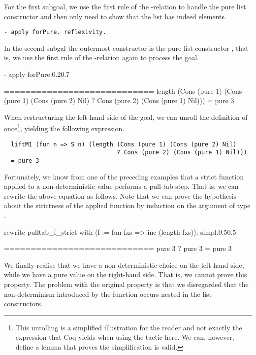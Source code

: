 For the first subgoal, we use the first rule of the -relation to handle the pure list constructor and then only need to show that the list has indeed  elements.

\begin{verbatim}
- apply forPure. reflexivity.
\end{verbatim}

In the second subgal the outermost constructor is the pure list constructor , that is, we use the first rule of the -relation again to process the goal.

\begin{cproof1}{- apply forPure.}{0.2}{0.7}

  ============================
  length (Cons (pure 1) (Cons (pure 1) (Cons (pure 2) Nil)
         ? Cons (pure 2) (Cons (pure 1) Nil)))
  = pure 3
\end{cproof1}

When restructuring the left-hand side of the goal, we can unroll the definition of  once\footnote{This unrolling is a simplified illustration for the reader and not exactly the expression that Coq yields when using the tactic  here. We can, however, define a lemma that proves the simplification is valid.}, yielding the following expression.

\begin{verbatim}
  liftM1 (fun n => S n) (length (Cons (pure 1) (Cons (pure 2) Nil)
                                ? Cons (pure 2) (Cons (pure 1) Nil)))
  = pure 3
\end{verbatim}

Fortunately, we know from one of the preceding examples that a strict function applied to a non-deterministic value performs a pull-tab step.
That is, we can rewrite the above equation as follows.
Note that we can prove the hypothesis about the strictness of the applied function  by induction on the argument of type .

\begin{cproof1}{rewrite pulltab_f_strict with (f := fun fxs => inc (length fxs)); simpl.}{0.5}{0.5}

  ============================
  pure 3 ? pure 3 = pure 3
\end{cproof1}

We finally realise that we have a non-deterministic choice on the left-hand side, while we have a pure value on the right-hand side.
That is, we cannot prove this property.
The problem with the original property is that we disregarded that the non-determinism introduced by the function  occurs nested in the list constructors.

